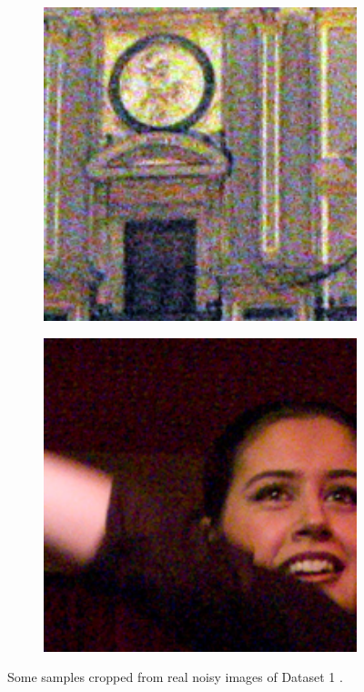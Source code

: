 \begin{figure}
\begin{subfigure}[t]{0.19\textwidth}
    \end{subfigure}
    \hfill
    \begin{subfigure}[t]{0.19\textwidth}
        \centering
        \includegraphics[width=1\textwidth]{images/guided/resize_palace.png}
    \end{subfigure}
    \hfill
    \begin{subfigure}[t]{0.19\textwidth}
        \centering
        \includegraphics[width=1\textwidth]{images/guided/resize_woman.png}
    \end{subfigure}
    \caption{Some samples cropped from real noisy images of Dataset 1 \cite{ncwebsite}.}
    \label{fig3-3}
\end{figure}


